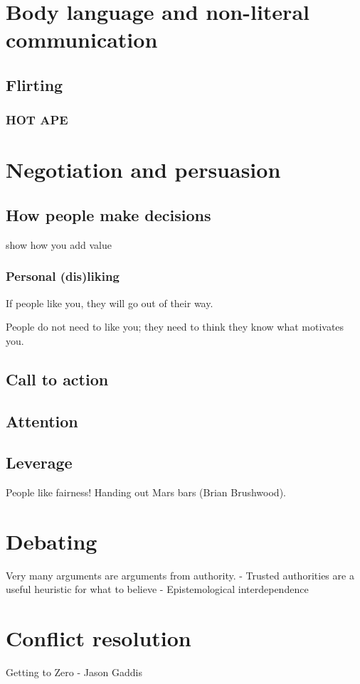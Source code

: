 \documentclass{report}
\begin{document}
\chapter{Body language and non-literal communication}
\section{Flirting}
\subsection{HOT APE}

\chapter{Negotiation and persuasion}
\section{How people make decisions}
show how you add value

\subsection{Personal (dis)liking}
If people like you, they will go out of their way.

People do not need to like you; they need to think they know what motivates you.


\section{Call to action}
\section{Attention}
\section{Leverage}
People like fairness! Handing out Mars bars (Brian Brushwood).

\chapter{Debating}
Very many arguments are arguments from authority.
- Trusted authorities are a useful heuristic for what to believe
- Epistemological interdependence

\chapter{Conflict resolution}
Getting to Zero - Jason Gaddis
\end{document}
